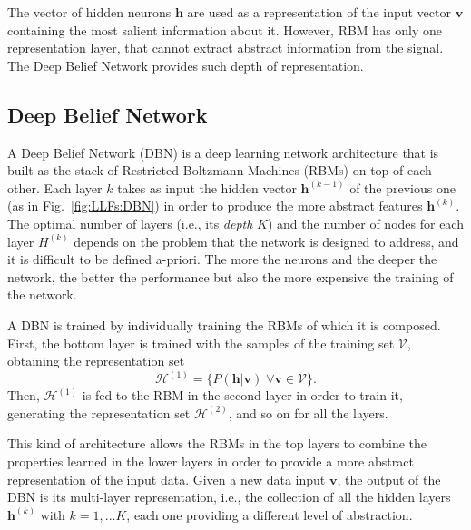 The vector of hidden neurons $\mathbf{h}$ are used as a representation of the input vector $\mathbf{v}$ containing the most salient information about it. However, RBM has only one representation layer, that cannot extract abstract information from the signal. The Deep Belief Network provides such depth of representation.

\subsection{Deep Belief Network}
A Deep Belief Network (DBN) \cite{Hinton2006} is a deep learning network architecture that is built as the stack of Restricted Boltzmann Machines (RBMs) on top of each other. Each layer $k$ takes as input the hidden vector $\mathbf{h}^{(k-1)}$ of the previous one (as in Fig.~\ref{fig:LLFs:DBN}) in order to produce the more abstract features $\mathbf{h}^{(k)}$. The optimal number of layers (i.e., its \textit{depth} $K$) and the number of nodes for each layer $H^{(k)}$ depends on the problem that the network is designed to address, and it is difficult to be defined a-priori. The more the neurons and the deeper the network, the better the performance but also the more expensive the training of the network.


A DBN is trained by individually training the RBMs of which it is composed. First, the bottom layer is trained with the samples of the training set $\mathcal{V}$, obtaining the representation set
$$\mathcal{H}^{(1)}=\{P(\mathbf{h}|\mathbf{v}) \; \forall \mathbf{v} \in \mathcal{V}\}.$$ 
Then, $\mathcal{H}^{(1)}$ is fed to the RBM in the second layer in order to train it, generating the representation set $\mathcal{H}^{(2)}$, and so on for all the layers. 

This kind of architecture allows the RBMs in the top layers to combine the properties learned in the lower layers in order to provide a more abstract representation of the input data. Given a new data input $\mathbf{v}$, the output of the DBN is its multi-layer representation, i.e., the collection of all the hidden layers  $\mathbf{h}^{(k)}$ with $k=1,...K$, each one providing a different level of abstraction.

